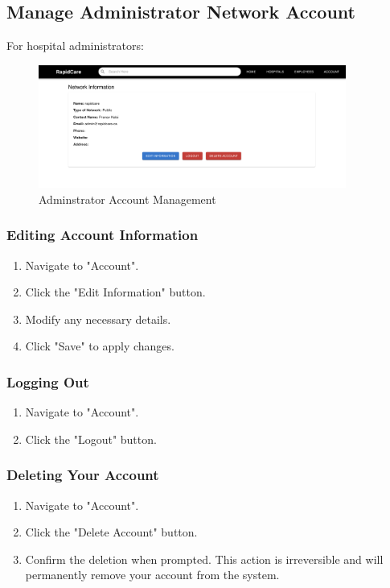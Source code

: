 \documentclass[12pt, titlepage]{article}
\begin{document}
\subsection{Manage Administrator Network Account}
For hospital administrators:

\begin{figure}[H]
\centering
\includegraphics[width=0.9\textwidth]{account.png}
\caption{Adminstrator Account Management}
\label{fig:Adminstrator Account Management}
\end{figure}

\subsubsection{Editing Account Information}
\begin{enumerate}
    \item Navigate to "Account".
    \item Click the "Edit Information" button.
    \item Modify any necessary details.
    \item Click "Save" to apply changes.
\end{enumerate}

\subsubsection{Logging Out}
\begin{enumerate}
    \item Navigate to "Account".
    \item Click the "Logout" button.
\end{enumerate}

\subsubsection{Deleting Your Account}
\begin{enumerate}
    \item Navigate to "Account".
    \item Click the "Delete Account" button.
    \item Confirm the deletion when prompted. This action is irreversible and will permanently remove your account from the system.
\end{enumerate}
\end{document}
